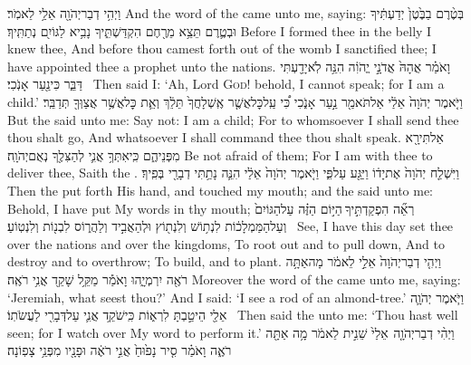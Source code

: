 {וַיְהִ֥י דְבַר\maqqaf יְהֹוָ֖ה אֵלַ֥י לֵאמֹֽר׃}
{And the word of the \lord\space came unto me, saying:}
{בְּטֶ֨רֶם  בַבֶּ֙טֶן֙ יְדַעְתִּ֔יךָ וּבְטֶ֛רֶם תֵּצֵ֥א מֵרֶ֖חֶם הִקְדַּשְׁתִּ֑יךָ נָבִ֥יא לַגּוֹיִ֖ם נְתַתִּֽיךָ׃}
{Before I formed thee in the belly I knew thee, And before thou camest forth out of the womb I sanctified thee; I have appointed thee a prophet unto the nations.}
{וָאֹמַ֗ר אֲהָהּ֙ אֲדֹנָ֣י יֱהֹוִ֔ה הִנֵּ֥ה לֹֽא\maqqaf יָדַ֖עְתִּי דַּבֵּ֑ר כִּי\maqqaf נַ֖עַר אָנֹֽכִי׃ \setuma }
{Then said I: ‘Ah, Lord \textsc{God}! behold, I cannot speak; for I am a child.’}
{וַיֹּ֤אמֶר יְהֹוָה֙ אֵלַ֔י אַל\maqqaf תֹּאמַ֖ר נַ֣עַר אָנֹ֑כִי כִּ֠י עַֽל\maqqaf כׇּל\maqqaf אֲשֶׁ֤ר אֶֽשְׁלָחֲךָ֙ תֵּלֵ֔ךְ וְאֵ֛ת כׇּל\maqqaf אֲשֶׁ֥ר אֲצַוְּךָ֖ תְּדַבֵּֽר׃}
{But the \lord\space said unto me: Say not: I am a child; For to whomsoever I shall send thee thou shalt go, And whatsoever I shall command thee thou shalt speak.}
{אַל\maqqaf תִּירָ֖א מִפְּנֵיהֶ֑ם כִּֽי\maqqaf אִתְּךָ֥ אֲנִ֛י לְהַצִּלֶ֖ךָ נְאֻם\maqqaf יְהֹוָֽה׃}
{Be not afraid of them; For I am with thee to deliver thee, Saith the \lord.}
{וַיִּשְׁלַ֤ח יְהֹוָה֙ אֶת\maqqaf יָד֔וֹ וַיַּגַּ֖ע עַל\maqqaf פִּ֑י וַיֹּ֤אמֶר יְהֹוָה֙ אֵלַ֔י הִנֵּ֛ה נָתַ֥תִּי דְבָרַ֖י בְּפִֽיךָ׃}
{Then the \lord\space put forth His hand, and touched my mouth; and the \lord\space said unto me: Behold, I have put My words in thy mouth;}
{רְאֵ֞ה הִפְקַדְתִּ֣יךָ \legarmeh  הַיּ֣וֹם הַזֶּ֗ה עַל\maqqaf הַגּוֹיִם֙ וְעַל\maqqaf הַמַּמְלָכ֔וֹת לִנְת֥וֹשׁ וְלִנְת֖וֹץ וּלְהַאֲבִ֣יד וְלַהֲר֑וֹס לִבְנ֖וֹת וְלִנְטֽוֹעַ׃ \petucha }
{See, I have this day set thee over the nations and over the kingdoms, To root out and to pull down, And to destroy and to overthrow; To build, and to plant.}
{וַיְהִ֤י דְבַר\maqqaf יְהֹוָה֙ אֵלַ֣י לֵאמֹ֔ר מָה\maqqaf אַתָּ֥ה רֹאֶ֖ה יִרְמְיָ֑הוּ וָאֹמַ֕ר מַקֵּ֥ל שָׁקֵ֖ד אֲנִ֥י רֹאֶֽה׃}
{Moreover the word of the \lord\space came unto me, saying: ‘Jeremiah, what seest thou?’ And I said: ‘I see a rod of an almond-tree.’}
{וַיֹּ֧אמֶר יְהֹוָ֛ה אֵלַ֖י הֵיטַ֣בְתָּ לִרְא֑וֹת כִּֽי\maqqaf שֹׁקֵ֥ד אֲנִ֛י עַל\maqqaf דְּבָרִ֖י לַעֲשֹׂתֽוֹ׃ \setuma }
{Then said the \lord\space unto me: ‘Thou hast well seen; for I watch over My word to perform it.’}
{וַיְהִ֨י דְבַר\maqqaf יְהֹוָ֤ה \pasek  אֵלַי֙ שֵׁנִ֣ית לֵאמֹ֔ר מָ֥ה אַתָּ֖ה רֹאֶ֑ה וָאֹמַ֗ר סִ֤יר נָפ֙וּחַ֙ אֲנִ֣י רֹאֶ֔ה וּפָנָ֖יו מִפְּנֵ֥י צָפֽוֹנָה׃}

